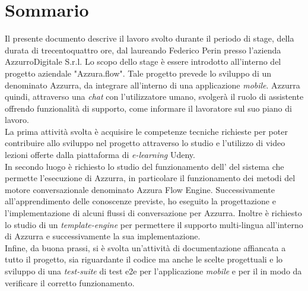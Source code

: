 
\cleardoublepage
{}
{}
\begingroup
\let\clearpage\relax
\let\cleardoublepage\relax
\let\cleardoublepage\relax

\chapter*{Sommario}

Il presente documento descrive il lavoro svolto durante il periodo di stage, della durata di trecentoquattro ore, dal laureando Federico Perin presso l'azienda AzzurroDigitale S.r.l.
Lo scopo dello stage è essere introdotto all'interno del progetto aziendale "Azzura.flow". Tale progetto prevede lo sviluppo di un  denominato Azzurra, da integrare all'interno di una applicazione \emph{mobile}. Azzurra quindi, attraverso una \emph{chat} con l'utilizzatore umano, svolgerà il ruolo di assistente offrendo funzionalità di supporto, come informare il lavoratore sul suo piano di lavoro. \\
 La prima attività svolta è acquisire le competenze tecniche richieste per poter contribuire allo sviluppo nel progetto attraverso lo studio e l'utilizzo di video lezioni offerte dalla piattaforma di \emph{e-learning} Udeny.\\
  In secondo luogo è richiesto lo studio del funzionamento dell' del sistema che permette l'esecuzione di Azzurra, in particolare il funzionamento dei metodi del motore conversazionale denominato Azzura Flow Engine. Successivamente all'apprendimento delle conoscenze previste, ho eseguito la progettazione e l'implementazione di alcuni flussi di conversazione per Azzurra. Inoltre è richiesto lo studio di un \emph{template-engine} per permettere il supporto multi-lingua all'interno di Azzurra e successivamente la sua implementazione. \\
   Infine, da buona prassi, si è svolta  un'attività di documentazione affiancata a tutto il progetto, sia riguardante il codice ma anche le scelte progettuali e lo sviluppo di una \emph{test-suite} di \gls{test e2e} per l'applicazione \emph{mobile} e per il  in modo da verificare il corretto funzionamento.




%
%

\endgroup			

\vfill

